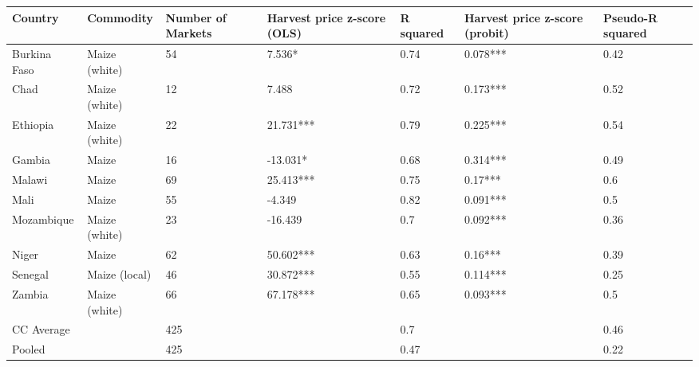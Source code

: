 \begin{table}[ht]
\centering
\begin{tabular}{lllllll}
  \hline
Country & Commodity & Number of Markets & Harvest price z-score (OLS) & R squared & Harvest price z-score (probit) & Pseudo-R squared \\ 
  \hline
Burkina Faso & Maize (white) & 54 & 7.536*  & 0.74 & 0.078*** & 0.42 \\ 
  Chad & Maize (white) & 12 & 7.488  & 0.72 & 0.173*** & 0.52 \\ 
  Ethiopia & Maize (white) & 22 & 21.731*** & 0.79 & 0.225*** & 0.54 \\ 
  Gambia & Maize & 16 & -13.031*  & 0.68 & 0.314*** & 0.49 \\ 
  Malawi & Maize & 69 & 25.413*** & 0.75 & 0.17*** & 0.6 \\ 
  Mali & Maize & 55 & -4.349  & 0.82 & 0.091*** & 0.5 \\ 
  Mozambique & Maize (white) & 23 & -16.439  & 0.7 & 0.092*** & 0.36 \\ 
  Niger & Maize & 62 & 50.602*** & 0.63 & 0.16*** & 0.39 \\ 
  Senegal & Maize (local) & 46 & 30.872*** & 0.55 & 0.114*** & 0.25 \\ 
  Zambia & Maize (white) & 66 & 67.178*** & 0.65 & 0.093*** & 0.5 \\ 
  CC Average &  & 425 &  & 0.7 &  & 0.46 \\ 
  Pooled &  & 425 &  & 0.47 &  & 0.22 \\ 
   \hline
\end{tabular}
\end{table}

